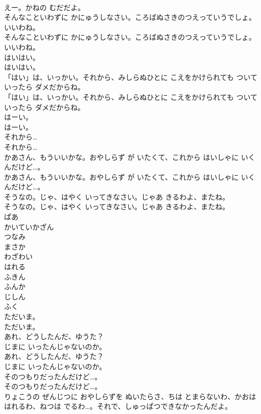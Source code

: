 \documentclass[8pt]{extreport}
\begin{document}
\begin{CJK}{UTF8}{min}
\\	えー。かねの むだだよ。
\\	そんなこといわずに かにゅうしなさい。ころばぬさきのつえっていうでしょ。いいわね。
\\	そんなこといわずに かにゅうしなさい。ころばぬさきのつえっていうでしょ。いいわね。
\\	はいはい。
\\	はいはい。
\\	「はい」は、いっかい。それから、みしらぬひとに こえをかけられても ついていったら ダメだからね。
\\	「はい」は、いっかい。それから、みしらぬひとに こえをかけられても ついていったら ダメだからね。
\\	はーい。
\\	はーい。
\\	それから…
\\	それから…
\\	かあさん、もういいかな。おやしらず が いたくて、これから はいしゃに いくんだけど…。
\\	かあさん、もういいかな。おやしらず が いたくて、これから はいしゃに いくんだけど…。
\\	そうなの。じゃ、はやく いってきなさい。じゃあ きるわよ、またね。
\\	そうなの。じゃ、はやく いってきなさい。じゃあ きるわよ、またね。
\\	ぱあ
\\	かいていかざん
\\	つなみ
\\	まさか
\\	わざわい
\\	はれる
\\	ふきん
\\	ふんか
\\	じしん
\\	ふく
\\	ただいま。
\\	ただいま。
\\	あれ、どうしたんだ、ゆうた？
\\	じまに いったんじゃないのか。
\\	あれ、どうしたんだ、ゆうた？
\\	じまに いったんじゃないのか。
\\	そのつもりだったんだけど…。
\\	そのつもりだったんだけど…。
\\	りょこうの ぜんじつに おやしらずを ぬいたらさ、ちは とまらないわ、かおは はれるわ、ねつは でるわ…。それで、しゅっぱつできなかったんだよ。

\end{CJK}
\end{document}
